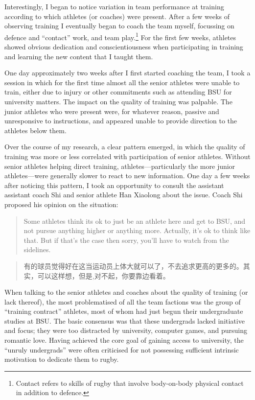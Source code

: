 \begin{CJK}{UTF8}{gbsn}
Interestingly, I began to notice variation in team performance at training according to which athletes (or coaches) were present.
After a few weeks of observing training I eventually began to coach the team myself, focussing on defence and ``contact'' work, and team play.\footnote{Contact refers to skills of rugby that involve body-on-body physical contact in addition to defence.}  For the first few weeks, athletes showed obvious dedication and conscientiousness when participating in training and learning the new content that I taught them.

One day approximately two weeks after I first started coaching the team,  I took a session in which for the first time almost all the senior athletes were unable to train, either due to injury or other commitments such as attending BSU for university matters.  The impact on the quality of training was palpable.  The junior athletes who were present were, for whatever reason, passive and unresponsive to instructions, and appeared unable to provide direction to the athletes below them.

Over the course of my research, a clear pattern emerged, in which the quality of training was more or less correlated with participation of senior athletes. Without senior athletes helping direct training, athletes---particularly the more junior athletes---were generally slower to react to new information.  One day a few weeks after noticing this pattern, I took an opportunity to consult the assistant assistant coach Shi and senior athlete Han Xiaolong about the issue.  Coach Shi proposed his opinion on the situation:
          \begin{quote}
         Some athletes think its ok to just be an athlete here and get to BSU, and not pursue anything higher or anything more.  Actually, it's ok to think like that. But if that's the case then sorry, you'll have to watch from the sidelines.
             \end{quote}
            \begin{quote}
                 有的球员觉得好在这当运动员上体大就可以了，不去追求更高的更多的。其实，可以这样想，但是,对不起，你要靠边看着。
             \end{quote}
When talking to the senior athletes and coaches about the quality of training (or lack thereof), the most problematised of all the team factions was the group of ``training contract'' athletes, most of whom had just begun their undergraduate studies at BSU.  The basic consensus was that these undergrads lacked initiative and focus; they were too distracted by university, computer games, and pursuing romantic love. Having achieved the core goal of gaining access to university, the ``unruly undergrads'' were often criticised for not possessing sufficient intrinsic motivation to dedicate them to rugby.


\end{CJK}
